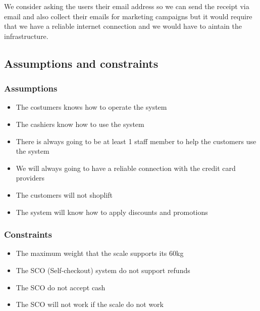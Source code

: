 We consider asking the users their email address so we can send the receipt 
via email and also collect their emails for marketing campaigns but it would 
require that we have a reliable internet connection and we would have to 
aintain the infrastructure.\newline

\pagebreak

\subsection{Assumptions and constraints}
\subsubsection{Assumptions}
\begin{itemize}
    \item The costumers knows how to operate the system
    \item The cashiers know how to use the system
    \item There is always going to be at least 1 staff member to help the 
    customers use the system
    \item We will always going to have a reliable connection with the credit 
    card providers
    \item The customers will not shoplift
    \item The system will know how to apply discounts and promotions
\end{itemize}

\subsubsection{Constraints}
\begin{itemize}
    \item The maximum weight that the scale supports its 60kg
    \item The SCO (Self-checkout) system do not support refunds
    \item The SCO do not accept cash
    \item The SCO will not work if the scale do not work
\end{itemize}